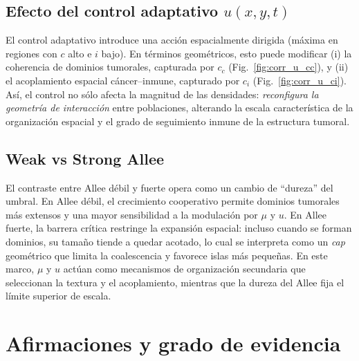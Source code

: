 \subsection{Efecto del control adaptativo $u(x,y,t)$}
El control adaptativo introduce una acción espacialmente dirigida (máxima en regiones con $c$ alto e $i$ bajo). En términos geométricos, esto puede modificar (i) la coherencia de dominios tumorales, capturada por $c_c$ (Fig.~\ref{fig:corr_u_cc}), y (ii) el acoplamiento espacial cáncer--inmune, capturado por $c_i$ (Fig.~\ref{fig:corr_u_ci}). Así, el control no sólo afecta la magnitud de las densidades: \emph{reconfigura la geometría de interacción} entre poblaciones, alterando la escala característica de la organización espacial y el grado de seguimiento inmune de la estructura tumoral.

\subsection{Weak vs Strong Allee}
El contraste entre Allee débil y fuerte opera como un cambio de ``dureza'' del umbral. En Allee débil, el crecimiento cooperativo permite dominios tumorales más extensos y una mayor sensibilidad a la modulación por $\mu$ y $u$. En Allee fuerte, la barrera crítica restringe la expansión espacial: incluso cuando se forman dominios, su tamaño tiende a quedar acotado, lo cual se interpreta como un \emph{cap} geométrico que limita la coalescencia y favorece islas más pequeñas. En este marco, $\mu$ y $u$ actúan como mecanismos de organización secundaria que seleccionan la textura y el acoplamiento, mientras que la dureza del Allee fija el límite superior de escala.

\section{Afirmaciones y grado de evidencia}
\label{sec:grado_evidencia}

